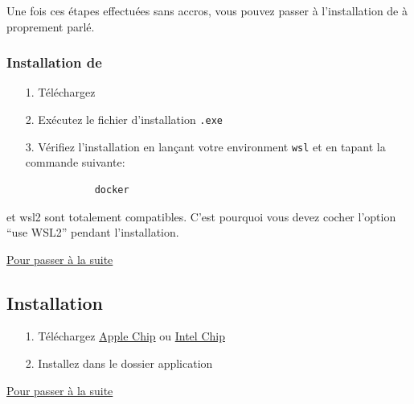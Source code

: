     Une fois ces étapes effectuées sans accros, vous pouvez passer à l'installation de \dockerdesktop{} à proprement parlé.

    \subsubsection[Installation de Docker Desktop]{Installation de \dockerdesktop}
    
    \begin{itemize}
        \item[1.] Téléchargez \href{https://desktop.docker.com/win/main/amd64/Docker%20Desktop%20Installer.exe}{\dockerdesktop{}}
        
        \item[2.] Exécutez le fichier d'installation \verb|.exe|
        
        \item[3.] Vérifiez l'installation en lançant votre environment \verb|wsl| et en tapant la commande suivante:
        \begin{lstlisting}
            docker
        \end{lstlisting}
    \end{itemize}

    \docker{} et wsl2 sont totalement compatibles. C'est pourquoi vous devez cocher l'option ``use WSL2'' pendant l'installation. 

    \hyperref[sec:suite_installation]{Pour passer à la suite}

\newpage
\subsection[Installation MacOS]{Installation \macos{}\label{sec:installation_macos}}

    \begin{itemize}
        \item[1.] Téléchargez \dockerdesktop{} \href{https://desktop.docker.com/mac/main/arm64/Docker.dmg?utm_source=docker&utm_medium=webreferral&utm_campaign=dd-smartbutton&utm_location=module}{Apple Chip} ou \href{https://desktop.docker.com/mac/main/amd64/Docker.dmg?utm_source=docker&utm_medium=webreferral&utm_campaign=dd-smartbutton&utm_location=module}{Intel Chip}
        \item[2.] Installez \dockerdesktop{} dans le dossier application
    \end{itemize}

    \hyperref[sec:suite_installation]{Pour passer à la suite}

